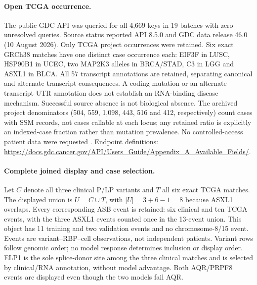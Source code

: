 \paragraph{Open TCGA occurrence.} The public GDC API was queried for all 4,669 keys in 19 batches with zero unresolved queries. Source status reported API 8.5.0 and GDC data release 46.0 (10 August 2026). Only TCGA project occurrences were retained. Six exact GRCh38 matches have one distinct case occurrence each: EIF3F in LUSC, HSP90B1 in UCEC, two MAP2K3 alleles in BRCA/STAD, C3 in LGG and ASXL1 in BLCA. All 57 transcript annotations are retained, separating canonical and alternate-transcript consequences. A coding mutation or an alternate-transcript UTR annotation does not establish an RNA-binding disease mechanism. Successful source absence is not biological absence. The archived project denominators (504, 559, 1,098, 443, 516 and 412, respectively) count cases with SSM records, not cases callable at each locus; any retained ratio is explicitly an indexed-case fraction rather than mutation prevalence. No controlled-access patient data were requested \citep{grossman2016gdc}. Endpoint definitions: \url{https://docs.gdc.cancer.gov/API/Users_Guide/Appendix_A_Available_Fields/}.

\paragraph{Complete joined display and case selection.} Let $C$ denote all three clinical P/LP variants and $T$ all six exact TCGA matches. The displayed union is $U=C\cup T$, with $|U|=3+6-1=8$ because ASXL1 overlaps. Every corresponding ASB event is retained: six clinical and ten TCGA events, with the three ASXL1 events counted once in the 13-event union. This object has 11 training and two validation events and no chromosome-8/15 event. Events are variant--RBP--cell observations, not independent patients. Variant rows follow genomic order; no model response determines inclusion or display order. ELP1 is the sole splice-donor site among the three clinical matches and is selected by clinical/RNA annotation, without model advantage. Both AQR/PRPF8 events are displayed even though the two models fail AQR.


